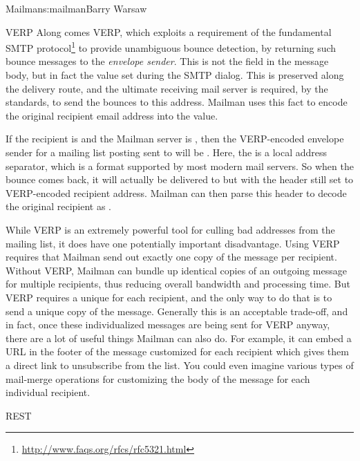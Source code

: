 \begin{aosachapter}{Mailman}{s:mailman}{Barry Warsaw}
\begin{aosasect1}{VERP}
Along comes VERP, which exploits a requirement of the fundamental SMTP
protocol\footnote{\url{http://www.faqs.org/rfcs/rfc5321.html}} to
provide unambiguous bounce detection, by returning such bounce
messages to the \emph{envelope sender}.  This is not the 
field in the message body, but in fact the  value set
during the SMTP dialog.  This is preserved along the delivery route,
and the ultimate receiving mail server is required, by the standards, to
send the bounces to this address.  Mailman uses this fact to encode
the original recipient email address into the  value.

If the recipient is  and the Mailman server is
, then the VERP-encoded envelope sender for a
mailing list posting sent to  will be
.  Here, the \code{+}
is a local address separator, which is a format supported by most
modern mail servers.  So when the bounce comes back, it will actually
be delivered to  but with the
 header still set to VERP-encoded recipient address.
Mailman can then parse this  header to decode the original
recipient as .

While VERP is an extremely powerful tool for culling bad addresses
from the mailing list, it does have one potentially important
disadvantage.  Using VERP requires that Mailman send out exactly one
copy of the message per recipient.  Without VERP, Mailman can bundle
up identical copies of an outgoing message for multiple recipients,
thus reducing overall bandwidth and processing time.  But VERP
requires a unique  for each recipient, and the only
way to do that is to send a unique copy of the message.  Generally
this is an acceptable trade-off, and in fact, once these
individualized messages are being sent for VERP anyway, there are a
lot of useful things Mailman can also do.  For example, it can embed a
URL in the footer of the message customized for each recipient which
gives them a direct link to unsubscribe from the list.  You could even
imagine various types of mail-merge operations for customizing
the body of the message for each individual recipient.

\end{aosasect1}

\begin{aosasect1}{REST}


\end{aosasect1}
\end{aosachapter}
